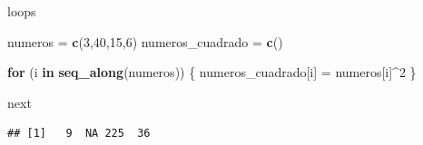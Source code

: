 \documentclass[ignorenonframetext,]{beamer}
\newenvironment{Shaded}{\begin{snugshade}}{\end{snugshade}}
\newcommand{\ControlFlowTok}[1]{\textcolor[rgb]{0.13,0.29,0.53}{\textbf{#1}}}
\newcommand{\DecValTok}[1]{\textcolor[rgb]{0.00,0.00,0.81}{#1}}
\newcommand{\KeywordTok}[1]{\textcolor[rgb]{0.13,0.29,0.53}{\textbf{#1}}}
\newcommand{\NormalTok}[1]{#1}
\newcommand{\OperatorTok}[1]{\textcolor[rgb]{0.81,0.36,0.00}{\textbf{#1}}}
\newcommand{\StringTok}[1]{\textcolor[rgb]{0.31,0.60,0.02}{#1}}
\begin{document}
\begin{frame}[fragile]{loops}
\protect\hypertarget{loops-2}{}

\begin{Shaded}
\begin{Highlighting}[]
\NormalTok{numeros =}\StringTok{ }\KeywordTok{c}\NormalTok{(}\DecValTok{3}\NormalTok{,}\DecValTok{40}\NormalTok{,}\DecValTok{15}\NormalTok{,}\DecValTok{6}\NormalTok{)}
\NormalTok{numeros_cuadrado =}\StringTok{ }\KeywordTok{c}\NormalTok{()}

\ControlFlowTok{for}\NormalTok{ (i }\ControlFlowTok{in} \KeywordTok{seq_along}\NormalTok{(numeros)) \{}
\NormalTok{  numeros_cuadrado[i] =}\StringTok{ }\NormalTok{numeros[i]}\OperatorTok{^}\DecValTok{2}
\NormalTok{\}}
\end{Highlighting}
\end{Shaded}

\end{frame}

\begin{frame}[fragile]{next}
\protect\hypertarget{next}{}

\begin{Shaded}
\end{Shaded}

\begin{verbatim}
## [1]   9  NA 225  36
\end{verbatim}

\end{frame}
\end{document}

